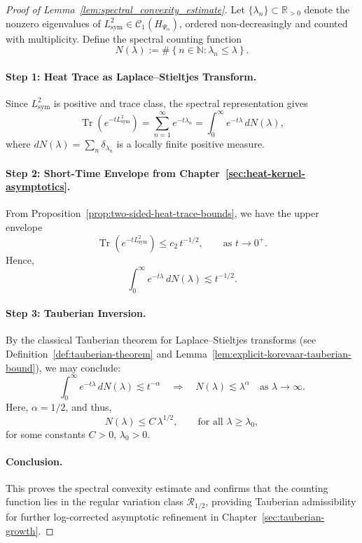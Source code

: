 \begin{proof}[Proof of Lemma~\ref{lem:spectral_convexity_estimate}]
Let \( \{ \lambda_n \} \subset \mathbb{R}_{>0} \) denote the nonzero eigenvalues of \( L_{\mathrm{sym}}^2 \in \mathcal{C}_1(H_{\Psi_\alpha}) \), ordered non-decreasingly and counted with multiplicity. Define the spectral counting function
\[
N(\lambda) := \#\left\{ n \in \mathbb{N} : \lambda_n \le \lambda \right\}.
\]

\paragraph{Step 1: Heat Trace as Laplace–Stieltjes Transform.}
Since \( L_{\mathrm{sym}}^2 \) is positive and trace class, the spectral representation gives
\[
\operatorname{Tr}(e^{-t L_{\mathrm{sym}}^2}) = \sum_{n=1}^\infty e^{-t \lambda_n}
= \int_0^\infty e^{-t\lambda} \, dN(\lambda),
\]
where \( dN(\lambda) = \sum_n \delta_{\lambda_n} \) is a locally finite positive measure.

\paragraph{Step 2: Short-Time Envelope from Chapter~\ref{sec:heat-kernel-asymptotics}.}
From Proposition~\ref{prop:two-sided-heat-trace-bounds}, we have the upper envelope
\[
\operatorname{Tr}(e^{-t L_{\mathrm{sym}}^2}) \leq c_2 \, t^{-1/2}, \qquad \text{as } t \to 0^+.
\]
Hence,
\[
\int_0^\infty e^{-t\lambda} \, dN(\lambda) \lesssim t^{-1/2}.
\]

\paragraph{Step 3: Tauberian Inversion.}
By the classical Tauberian theorem for Laplace–Stieltjes transforms (see Definition~\ref{def:tauberian-theorem} and Lemma~\ref{lem:explicit-korevaar-tauberian-bound}), we may conclude:
\[
\int_0^\infty e^{-t\lambda} \, dN(\lambda) \lesssim t^{-\alpha} \quad \Longrightarrow \quad N(\lambda) \lesssim \lambda^{\alpha} \quad \text{as } \lambda \to \infty.
\]
Here, \( \alpha = 1/2 \), and thus,
\[
N(\lambda) \leq C\, \lambda^{1/2}, \qquad \text{for all } \lambda \ge \lambda_0,
\]
for some constants \( C > 0 \), \( \lambda_0 > 0 \).

\paragraph{Conclusion.}
This proves the spectral convexity estimate and confirms that the counting function lies in the regular variation class \( \mathcal{R}_{1/2} \), providing Tauberian admissibility for further log-corrected asymptotic refinement in Chapter~\ref{sec:tauberian-growth}.
\end{proof}
